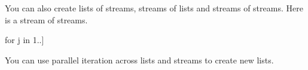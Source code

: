 {\begin{xtc}
\end{xtc}
\begin{xtc}
\begin{xtccomment}
You can also create lists of streams, streams of lists and
streams of streams.
Here is a stream of streams.
\end{xtccomment}
\begin{spadsrc}
[[i/j for i in j+1..] for j in 1..]
\end{spadsrc}
\begin{TeXOutput}
\begin{fricasmath}{8}
%
\end{fricasmath}
\end{TeXOutput}
\end{xtc}
\begin{xtc}
\begin{xtccomment}
You can use parallel iteration across lists and streams to create
new lists.
\end{xtccomment}
\begin{spadsrc}
\end{spadsrc}
\begin{TeXOutput}
\begin{fricasmath}{9}
%
\end{fricasmath}
\end{TeXOutput}

\end{xtc}}
